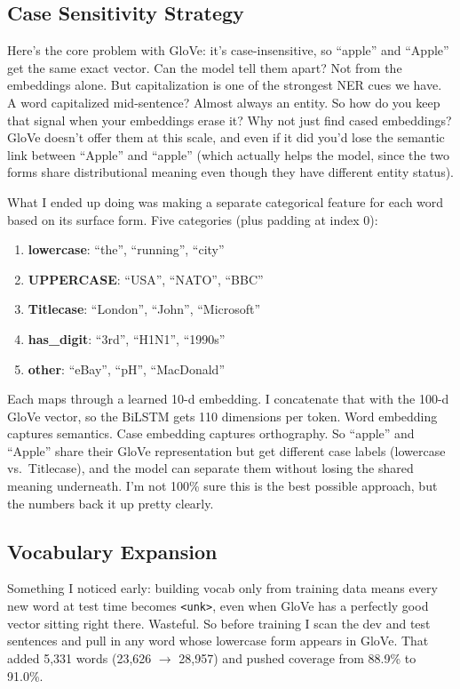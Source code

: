 \documentclass[11pt]{article}
\begin{document}
\subsection{Case Sensitivity Strategy}

Here's the core problem with GloVe: it's case-insensitive, so ``apple'' and ``Apple'' get the same exact vector. Can the model tell them apart? Not from the embeddings alone. But capitalization is one of the strongest NER cues we have. A word capitalized mid-sentence? Almost always an entity. So how do you keep that signal when your embeddings erase it? Why not just find cased embeddings? GloVe doesn't offer them at this scale, and even if it did you'd lose the semantic link between ``Apple'' and ``apple'' (which actually helps the model, since the two forms share distributional meaning even though they have different entity status).

What I ended up doing was making a separate categorical feature for each word based on its surface form. Five categories (plus padding at index 0):

\begin{enumerate}[nosep]
\item \textbf{lowercase}: ``the'', ``running'', ``city''
\item \textbf{UPPERCASE}: ``USA'', ``NATO'', ``BBC''
\item \textbf{Titlecase}: ``London'', ``John'', ``Microsoft''
\item \textbf{has\_digit}: ``3rd'', ``H1N1'', ``1990s''
\item \textbf{other}: ``eBay'', ``pH'', ``MacDonald''
\end{enumerate}

Each maps through a learned 10-d embedding. I concatenate that with the 100-d GloVe vector, so the BiLSTM gets 110 dimensions per token. Word embedding captures semantics. Case embedding captures orthography. So ``apple'' and ``Apple'' share their GloVe representation but get different case labels (lowercase vs.\ Titlecase), and the model can separate them without losing the shared meaning underneath. I'm not 100\% sure this is the best possible approach, but the numbers back it up pretty clearly.

\subsection{Vocabulary Expansion}

Something I noticed early: building vocab only from training data means every new word at test time becomes \texttt{<unk>}, even when GloVe has a perfectly good vector sitting right there. Wasteful. So before training I scan the dev and test sentences and pull in any word whose lowercase form appears in GloVe. That added 5,331 words (23,626 $\rightarrow$ 28,957) and pushed coverage from 88.9\% to 91.0\%.
\end{document}
